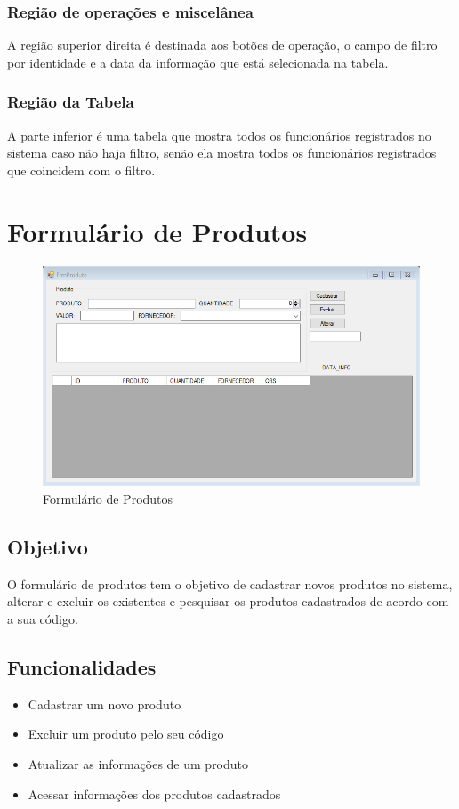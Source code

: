 \documentclass[
	article,			%
	12pt,				%
	oneside,			%
	a4paper,			%
	english,			%
	brazil,				%
	sumario=tradicional
	]{abntex2}
\begin{document}
	\subsubsection{Região de operações e miscelânea}
	A região superior direita é destinada aos botões de operação, o campo de filtro por identidade e a data da informação que está selecionada na tabela.
	\subsubsection{Região da Tabela}
	A parte inferior é uma tabela que mostra todos os funcionários registrados no sistema caso não haja filtro, senão ela mostra todos os funcionários registrados que coincidem com o filtro.
\newpage
	\section{Formulário de Produtos}
	\begin{figure}[!htb]
		\centering
		\includegraphics[scale=0.7]{../Figuras/FrmProduto.png}
		\caption{Formulário de Produtos}
	\end{figure}
	\subsection{Objetivo}
	O formulário de produtos tem o objetivo de cadastrar novos produtos no sistema, alterar e excluir os existentes e pesquisar os produtos cadastrados de acordo com a sua código.
	\subsection{Funcionalidades}
	\begin{itemize}
		\item Cadastrar um novo produto
		\item Excluir um produto pelo seu código
		\item Atualizar as informações de um produto
		\item Acessar informações dos produtos cadastrados
	\end{itemize}
\end{document}
